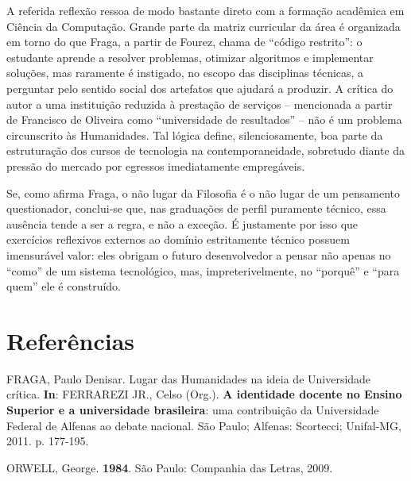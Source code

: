 \documentclass[12pt]{article}
\begin{document}
A referida reflexão ressoa de modo bastante direto com a formação acadêmica em Ciência da Computação. Grande parte da matriz curricular da área é organizada em torno do que Fraga, a partir de Fourez, chama de ``código restrito'': o estudante aprende a resolver problemas, otimizar algoritmos e implementar soluções, mas raramente é instigado, no escopo das disciplinas técnicas, a perguntar pelo sentido social dos artefatos que ajudará a produzir. A crítica do autor a uma instituição reduzida à prestação de serviços -- mencionada a partir de Francisco de Oliveira como ``universidade de resultados'' -- não é um problema circunscrito às Humanidades. Tal lógica define, silenciosamente, boa parte da estruturação dos cursos de tecnologia na contemporaneidade, sobretudo diante da pressão do mercado por egressos imediatamente empregáveis. 

Se, como afirma Fraga, o não lugar da Filosofia é o não lugar de um pensamento questionador, conclui-se que, nas graduações de perfil puramente técnico, essa ausência tende a ser a regra, e não a exceção. É justamente por isso que exercícios reflexivos externos ao domínio estritamente técnico possuem imensurável valor: eles obrigam o futuro desenvolvedor a pensar não apenas no ``como'' de um sistema tecnológico, mas, impreterivelmente, no ``porquê'' e ``para quem'' ele é construído.

\newpage %

\section*{Referências}

\begin{singlespace}
\begin{flushleft} %

FRAGA, Paulo Denisar. Lugar das Humanidades na ideia de Universidade
crítica. \textbf{In}: FERRAREZI JR., Celso (Org.). \textbf{A identidade
docente no Ensino Superior e a universidade brasileira}: uma contribuição
da Universidade Federal de Alfenas ao debate nacional. São Paulo; Alfenas:
Scortecci; Unifal-MG, 2011. p. 177-195.

\vspace{12pt} %

ORWELL, George. \textbf{1984}. São Paulo: Companhia das Letras, 2009.

\end{flushleft}
\end{singlespace}
\end{document}
